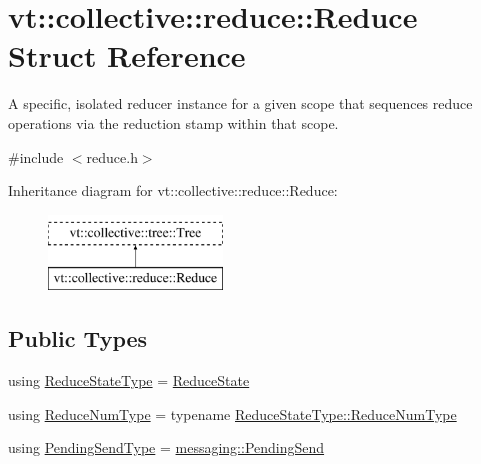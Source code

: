 \hypertarget{structvt_1_1collective_1_1reduce_1_1_reduce}{}\section{vt\+:\+:collective\+:\+:reduce\+:\+:Reduce Struct Reference}
\label{structvt_1_1collective_1_1reduce_1_1_reduce}


A specific, isolated reducer instance for a given scope that sequences reduce operations via the reduction stamp within that scope.  




{\ttfamily \#include $<$reduce.\+h$>$}

Inheritance diagram for vt\+:\+:collective\+:\+:reduce\+:\+:Reduce\+:\begin{figure}[H]
\begin{center}
\leavevmode
\includegraphics[height=2.000000cm]{structvt_1_1collective_1_1reduce_1_1_reduce}
\end{center}
\end{figure}
\subsection*{Public Types}
\begin{DoxyCompactItemize}
\item 
using \hyperlink{structvt_1_1collective_1_1reduce_1_1_reduce_ab0e89b962f0741718107772505fe6d34}{Reduce\+State\+Type} = \hyperlink{structvt_1_1collective_1_1reduce_1_1_reduce_state}{Reduce\+State}
\item 
using \hyperlink{structvt_1_1collective_1_1reduce_1_1_reduce_a6c3e63aca10c31d2823b0b18cf9762a4}{Reduce\+Num\+Type} = typename \hyperlink{structvt_1_1collective_1_1reduce_1_1_reduce_state_ae83d217c90b8a8895ca998d7ea9c49e4}{Reduce\+State\+Type\+::\+Reduce\+Num\+Type}
\item 
using \hyperlink{structvt_1_1collective_1_1reduce_1_1_reduce_a0474b491f3c93014d9a0ce0356c6bfd5}{Pending\+Send\+Type} = \hyperlink{structvt_1_1messaging_1_1_pending_send}{messaging\+::\+Pending\+Send}
\end{DoxyCompactItemize}
